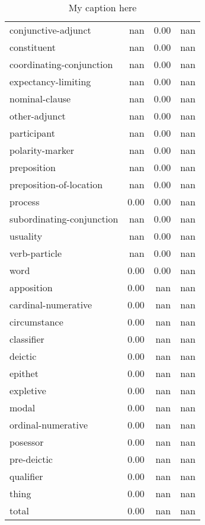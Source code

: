 \begin{table}[!ht]
\begin{tabular}{lrrr}
conjunctive-adjunct       &        nan &    0.00 &  nan \\
constituent               &        nan &    0.00 &  nan \\
coordinating-conjunction  &        nan &    0.00 &  nan \\
expectancy-limiting       &        nan &    0.00 &  nan \\
nominal-clause            &        nan &    0.00 &  nan \\
other-adjunct             &        nan &    0.00 &  nan \\
participant               &        nan &    0.00 &  nan \\
polarity-marker           &        nan &    0.00 &  nan \\
preposition               &        nan &    0.00 &  nan \\
preposition-of-location   &        nan &    0.00 &  nan \\
process                   &       0.00 &    0.00 &  nan \\
subordinating-conjunction &        nan &    0.00 &  nan \\
usuality                  &        nan &    0.00 &  nan \\
verb-particle             &        nan &    0.00 &  nan \\
word                      &       0.00 &    0.00 &  nan \\
apposition                &       0.00 &     nan &  nan \\
cardinal-numerative       &       0.00 &     nan &  nan \\
circumstance              &       0.00 &     nan &  nan \\
classifier                &       0.00 &     nan &  nan \\
deictic                   &       0.00 &     nan &  nan \\
epithet                   &       0.00 &     nan &  nan \\
expletive                 &       0.00 &     nan &  nan \\
modal                     &       0.00 &     nan &  nan \\
ordinal-numerative        &       0.00 &     nan &  nan \\
posessor                  &       0.00 &     nan &  nan \\
pre-deictic               &       0.00 &     nan &  nan \\
qualifier                 &       0.00 &     nan &  nan \\
thing                     &       0.00 &     nan &  nan \\
total                     &       0.00 &     nan &  nan \\
\bottomrule
\end{tabular}
\caption{My caption here}
\label{tab:constituency-general-combined-F1}
\end{table}